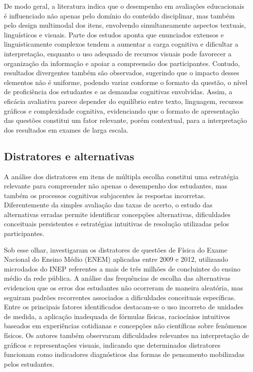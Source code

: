 \documentclass[a4paper,10pt, twocolumn]{article}
\begin{document}
De modo geral, a literatura indica que o desempenho em avaliações educacionais é influenciado não apenas pelo domínio do conteúdo disciplinar, mas também pelo design multimodal dos itens, envolvendo simultaneamente aspectos textuais, linguísticos e visuais. Parte dos estudos aponta que enunciados extensos e linguisticamente complexos tendem a aumentar a carga cognitiva e dificultar a interpretação, enquanto o uso adequado de recursos visuais pode favorecer a organização da informação e apoiar a compreensão dos participantes. Contudo, resultados divergentes também são observados, sugerindo que o impacto desses elementos não é uniforme, podendo variar conforme o formato da questão, o nível de proficiência dos estudantes e as demandas cognitivas envolvidas. Assim, a eficácia avaliativa parece depender do equilíbrio entre texto, linguagem, recursos gráficos e complexidade cognitiva, evidenciando que o formato de apresentação das questões constitui um fator relevante, porém contextual, para a interpretação dos resultados em exames de larga escala.

\subsection{Distratores e alternativas}

A análise dos distratores em itens de múltipla escolha constitui uma estratégia relevante para compreender não apenas o desempenho dos estudantes, mas também os processos cognitivos subjacentes às respostas incorretas. Diferentemente da simples avaliação das taxas de acerto, o estudo das alternativas erradas permite identificar concepções alternativas, dificuldades conceituais persistentes e estratégias intuitivas de resolução utilizadas pelos participantes.

Sob esse olhar, \textcite{Marcom2016} investigaram os distratores de questões de Física do Exame Nacional do Ensino Médio (ENEM) aplicadas entre 2009 e 2012, utilizando microdados do INEP referentes a mais de três milhões de concluintes do ensino médio da rede pública. A análise das frequências de escolha das alternativas evidenciou que os erros dos estudantes não ocorreram de maneira aleatória, mas seguiram padrões recorrentes associados a dificuldades conceituais específicas. Entre os principais fatores identificados destacam-se o uso incorreto de unidades de medida, a aplicação inadequada de fórmulas físicas, raciocínios intuitivos baseados em experiências cotidianas e concepções não científicas sobre fenômenos físicos. Os autores também observaram dificuldades relevantes na interpretação de gráficos e representações visuais, indicando que determinados distratores funcionam como indicadores diagnósticos das formas de pensamento mobilizadas pelos estudantes.
\end{document}
